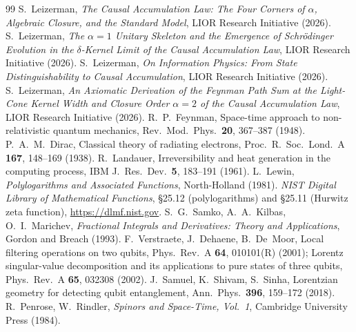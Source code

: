 \documentclass[11pt]{amsart}
\theoremstyle{definition}
\theoremstyle{remark}
\begin{document}
\begin{thebibliography}{99}
 S.~Leizerman, \emph{The Causal Accumulation Law: The Four Corners of $\alpha$, Algebraic Closure, and the Standard Model}, LIOR Research Initiative (2026).
 S.~Leizerman, \emph{The $\alpha=1$ Unitary Skeleton and the Emergence of Schr\"odinger Evolution in the $\delta$-Kernel Limit of the Causal Accumulation Law}, LIOR Research Initiative (2026).
 S.~Leizerman, \emph{On Information Physics: From State Distinguishability to Causal Accumulation}, LIOR Research Initiative (2026).
 S.~Leizerman, \emph{An Axiomatic Derivation of the Feynman Path Sum at the Light-Cone Kernel Width and Closure Order $\alpha=2$ of the Causal Accumulation Law}, LIOR Research Initiative (2026).
 R.~P.~Feynman, Space-time approach to non-relativistic quantum mechanics, Rev.\ Mod.\ Phys.\ \textbf{20}, 367--387 (1948).
 P.~A.~M.~Dirac, Classical theory of radiating electrons, Proc.\ R.\ Soc.\ Lond.\ A \textbf{167}, 148--169 (1938).
 R.~Landauer, Irreversibility and heat generation in the computing process, IBM J.\ Res.\ Dev.\ \textbf{5}, 183--191 (1961).
 L.~Lewin, \emph{Polylogarithms and Associated Functions}, North-Holland (1981).
 \emph{NIST Digital Library of Mathematical Functions}, \S25.12 (polylogarithms) and \S25.11 (Hurwitz zeta function), \url{https://dlmf.nist.gov}.
 S.~G.~Samko, A.~A.~Kilbas, O.~I.~Marichev, \emph{Fractional Integrals and Derivatives: Theory and Applications}, Gordon and Breach (1993).
 F.~Verstraete, J.~Dehaene, B.~De~Moor, Local filtering operations on two qubits, Phys.\ Rev.\ A \textbf{64}, 010101(R) (2001); Lorentz singular-value decomposition and its applications to pure states of three qubits, Phys.\ Rev.\ A \textbf{65}, 032308 (2002).
 J.~Samuel, K.~Shivam, S.~Sinha, Lorentzian geometry for detecting qubit entanglement, Ann.\ Phys.\ \textbf{396}, 159--172 (2018).
 R.~Penrose, W.~Rindler, \emph{Spinors and Space-Time, Vol.~1}, Cambridge University Press (1984).
\end{thebibliography}
\end{document}
